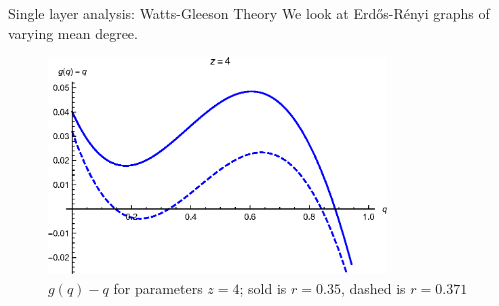 \documentclass[10pt, xcolor=dvipsnames, handout]{beamer}
\begin{document}
\begin{frame}{Single layer analysis: Watts-Gleeson Theory}
We look at Erdős-Rényi graphs of varying mean degree.
\begin{figure}[htb]
\includegraphics[width=0.8\textwidth]{figures/single_layer_gq}
\caption{$g(q)-q$ for parameters $z=4$;  sold is $r=0.35$, dashed is $r=0.371$}
\end{figure}

\end{frame}
\end{document}
